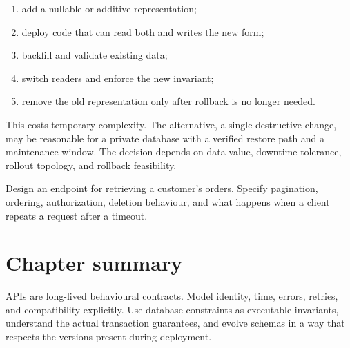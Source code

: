 \begin{enumerate}
  \item add a nullable or additive representation;
  \item deploy code that can read both and writes the new form;
  \item backfill and validate existing data;
  \item switch readers and enforce the new invariant;
  \item remove the old representation only after rollback is no longer needed.
\end{enumerate}

This costs temporary complexity. The alternative, a single destructive change,
may be reasonable for a private database with a verified restore path and a
maintenance window. The decision depends on data value, downtime tolerance,
rollout topology, and rollback feasibility.

\begin{exercise}
Design an endpoint for retrieving a customer's orders. Specify pagination,
ordering, authorization, deletion behaviour, and what happens when a client
repeats a request after a timeout.
\end{exercise}

\section{Chapter summary}
APIs are long-lived behavioural contracts. Model identity, time, errors, retries,
and compatibility explicitly. Use database constraints as executable invariants,
understand the actual transaction guarantees, and evolve schemas in a way that
respects the versions present during deployment.

